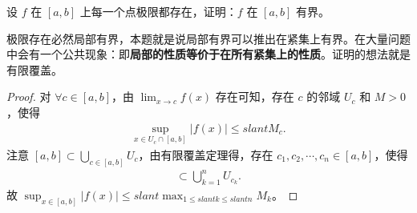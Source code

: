 \documentclass[../../main.tex]{subfiles}
\begin{document}
\begin{example}
设 \(f\) 在 \([a,b]\) 上每一个点极限都存在，证明：\(f\) 在 \([a,b]\) 有界。
\end{example}
\begin{note}
极限存在必然局部有界，本题就是说局部有界可以推出在紧集上有界。在大量问题中会有一个公共现象：即\textbf{局部的性质等价于在所有紧集上的性质}。证明的想法就是有限覆盖。 
\end{note}
\begin{proof}
对 \(\forall c\in [a,b]\)，由 \(\lim_{x\rightarrow c}f(x)\) 存在可知，存在 \(c\) 的邻域 \(U_c\) 和 \(M>0\)，使得
\begin{align*}
\sup_{x\in U_c\cap [a,b]}|f(x)|\leqslant slant M_c.
\end{align*}
注意 \([a,b]\subset \bigcup_{c\in [a,b]}U_c\)，由有限覆盖定理得，存在 \(c_1,c_2,\cdots,c_n\in [a,b]\)，使得
\begin{align*}
[a,b]\subset \bigcup_{k = 1}^nU_{c_k}. 
\end{align*}
故 \(\sup_{x\in [a,b]}|f(x)|\leqslant slant \max_{1\leqslant slant k\leqslant slant n}M_k\)。 
\end{proof}
\end{document}
